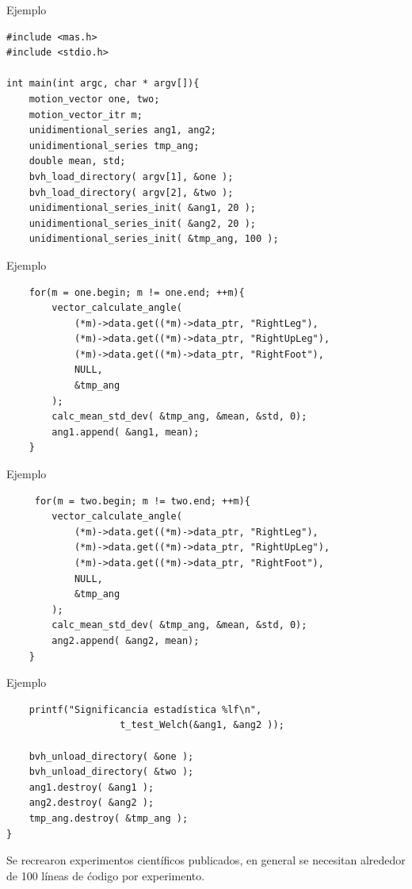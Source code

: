\documentclass{beamer} %
\begin{document}
\begin{frame}[fragile]{Ejemplo}  
\begin{verbatim}
#include <mas.h>
#include <stdio.h>

int main(int argc, char * argv[]){
    motion_vector one, two;
    motion_vector_itr m;
    unidimentional_series ang1, ang2;
    unidimentional_series tmp_ang;
    double mean, std;
    bvh_load_directory( argv[1], &one );
    bvh_load_directory( argv[2], &two );
    unidimentional_series_init( &ang1, 20 );
    unidimentional_series_init( &ang2, 20 );
    unidimentional_series_init( &tmp_ang, 100 );
\end{verbatim}
\end{frame}

\begin{frame}[fragile]{Ejemplo}
    \begin{verbatim}
    for(m = one.begin; m != one.end; ++m){
        vector_calculate_angle( 
            (*m)->data.get((*m)->data_ptr, "RightLeg"), 
            (*m)->data.get((*m)->data_ptr, "RightUpLeg"),
            (*m)->data.get((*m)->data_ptr, "RightFoot"),
            NULL,
            &tmp_ang
        );
        calc_mean_std_dev( &tmp_ang, &mean, &std, 0);
        ang1.append( &ang1, mean);
    }
\end{verbatim}
\end{frame}

\begin{frame}[fragile]{Ejemplo}
\begin{verbatim}
     for(m = two.begin; m != two.end; ++m){
        vector_calculate_angle( 
            (*m)->data.get((*m)->data_ptr, "RightLeg"), 
            (*m)->data.get((*m)->data_ptr, "RightUpLeg"),
            (*m)->data.get((*m)->data_ptr, "RightFoot"),
            NULL,
            &tmp_ang
        );
        calc_mean_std_dev( &tmp_ang, &mean, &std, 0);
        ang2.append( &ang2, mean);
    }
\end{verbatim}
\end{frame}

\begin{frame}[fragile]{Ejemplo}
\begin{verbatim}
    printf("Significancia estadística %lf\n", 
                    t_test_Welch(&ang1, &ang2 ));

    bvh_unload_directory( &one );
    bvh_unload_directory( &two );
    ang1.destroy( &ang1 );
    ang2.destroy( &ang2 );
    tmp_ang.destroy( &tmp_ang );
}
\end{verbatim}
\begin{block}{}
    Se recrearon experimentos científicos publicados, en general se necesitan alrededor de 100 líneas de ćodigo por experimento. 
\end{block}
\end{frame}
\end{document}
